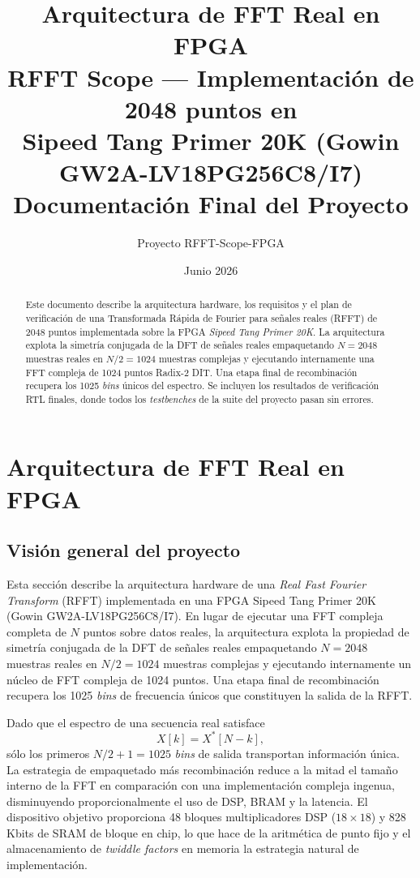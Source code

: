 \documentclass[11pt,a4paper]{article}
\title{\textbf{Arquitectura de FFT Real en FPGA}\\[0.4em]
       \large RFFT Scope — Implementación de 2048 puntos en\\
       Sipeed Tang Primer 20K (Gowin GW2A-LV18PG256C8/I7)\\[0.6em]
       \normalsize Documentación Final del Proyecto}
\author{Proyecto RFFT-Scope-FPGA}
\date{Junio 2026}
\begin{document}
\maketitle
\begin{abstract}
Este documento describe la arquitectura hardware, los requisitos y el plan de
verificación de una Transformada Rápida de Fourier para señales reales (RFFT)
de 2048 puntos implementada sobre la FPGA \textit{Sipeed Tang Primer 20K}.
La arquitectura explota la simetría conjugada de la DFT de señales reales
empaquetando $N=2048$ muestras reales en $N/2=1024$ muestras complejas y
ejecutando internamente una FFT compleja de 1024 puntos Radix-2 DIT. Una etapa
final de recombinación recupera los 1025 \textit{bins} únicos del espectro.
Se incluyen los resultados de verificación RTL finales, donde todos los
\textit{testbenches} de la suite del proyecto pasan sin errores.
\end{abstract}

\tableofcontents
\newpage

\section{Arquitectura de FFT Real en FPGA}

\subsection{Visión general del proyecto}
Esta sección describe la arquitectura hardware de una \emph{Real Fast Fourier
Transform} (RFFT) implementada en una FPGA Sipeed Tang Primer 20K
(Gowin GW2A-LV18PG256C8/I7). En lugar de ejecutar una FFT compleja completa de
$N$ puntos sobre datos reales, la arquitectura explota la propiedad de simetría
conjugada de la DFT de señales reales empaquetando $N=2048$ muestras reales en
$N/2=1024$ muestras complejas y ejecutando internamente un núcleo de FFT
compleja de 1024 puntos. Una etapa final de recombinación recupera los 1025
\emph{bins} de frecuencia únicos que constituyen la salida de la RFFT.

Dado que el espectro de una secuencia real satisface
\begin{equation}
  X[k] = X^{*}[N-k],
\end{equation}
sólo los primeros $N/2+1 = 1025$ \emph{bins} de salida transportan información
única. La estrategia de empaquetado más recombinación reduce a la mitad el
tamaño interno de la FFT en comparación con una implementación compleja
ingenua, disminuyendo proporcionalmente el uso de DSP, BRAM y la latencia. El
dispositivo objetivo proporciona 48 bloques multiplicadores DSP ($18\times18$)
y 828\,Kbits de SRAM de bloque en chip, lo que hace de la aritmética de punto
fijo y el almacenamiento de \emph{twiddle factors} en memoria la estrategia
natural de implementación.
\end{document}
